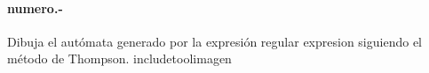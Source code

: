 

\paragraph{{numero}.-}\label{p{numero}}
Dibuja el autómata generado por la expresión regular {expresion} siguiendo el método de Thompson.
    {includetool}{{imagen}}
